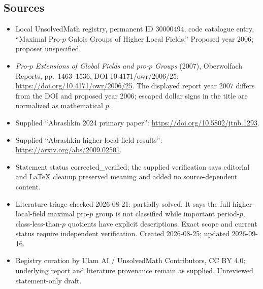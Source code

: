 \documentclass[11pt]{article}
\begin{document}
\subsection{Sources}
\begin{itemize}
\item Local UnsolvedMath registry, permanent ID 30000494, code catalogue entry, ``Maximal Pro-$p$ Galois Groups of Higher Local Fields.'' Proposed year 2006; proposer unspecified.
\item \emph{Pro-$p$ Extensions of Global Fields and pro-$p$ Groups} (2007), Oberwolfach Reports, pp.\ 1463--1536, DOI 10.4171/owr/2006/25; \url{https://doi.org/10.4171/owr/2006/25}. The displayed report year 2007 differs from the DOI and proposed year 2006; escaped dollar signs in the title are normalized as mathematical $p$.
\item Supplied ``Abrashkin 2024 primary paper'': \url{https://doi.org/10.5802/jtnb.1293}.
\item Supplied ``Abrashkin higher-local-field results'': \url{https://arxiv.org/abs/2009.02501}.
\item Statement status corrected\_verified; the supplied verification says editorial and LaTeX cleanup preserved meaning and added no source-dependent content.
\item Literature triage checked 2026-08-21: partially solved. It says the full higher-local-field maximal pro-$p$ group is not classified while important period-$p$, class-less-than-$p$ quotients have explicit descriptions. Exact scope and current status require independent verification. Created 2026-08-25; updated 2026-09-16.
\item Registry curation by Ulam AI / UnsolvedMath Contributors, CC BY 4.0; underlying report and literature provenance remain as supplied. Unreviewed statement-only draft.
\end{itemize}
\end{document}

